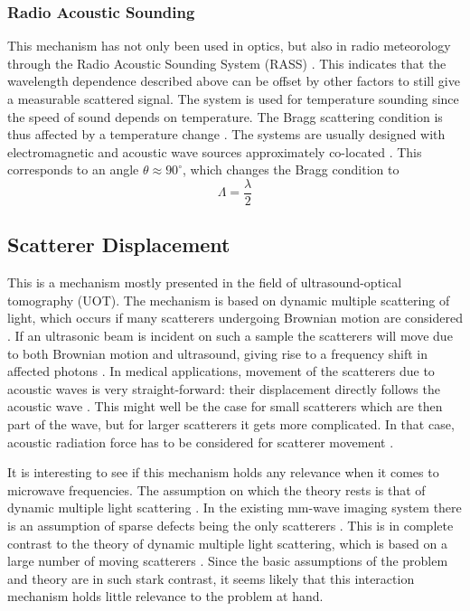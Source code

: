 \documentclass[10pt,a4paper]{eitExjobb}
\begin{document}
	\subsubsection{Radio Acoustic Sounding} 
	This mechanism has not only been used in optics, but also in radio meteorology through the Radio Acoustic Sounding System (RASS) \cite{Buerkle2007}. This indicates that the wavelength dependence described above can be offset by other factors to still give a measurable scattered signal. The system is used for temperature sounding since the speed of sound depends on temperature. The Bragg scattering condition is thus affected by a temperature change \cite{Marshall1972}. The systems are usually designed with electromagnetic and acoustic wave sources approximately co-located \cite{Marshall1972}. This corresponds to an angle $\theta \approx 90^\circ$, which changes the Bragg condition to
	\begin{equation*}
	\Lambda = \frac{\lambda}{2}
	\end{equation*}
	
	\subsection{Scatterer Displacement}
	This is a mechanism mostly presented in the field of ultrasound-optical tomography (UOT). The mechanism is based on dynamic multiple scattering of light, which occurs if many scatterers undergoing Brownian motion are considered \cite{Leutz1995}. If an ultrasonic beam is incident on such a sample the scatterers will move due to both Brownian motion and ultrasound, giving rise to a frequency shift in affected photons \cite{Leutz1995}\cite{Elson2011}. In medical applications, movement of the scatterers due to acoustic waves is very straight-forward: their displacement directly follows the acoustic wave \cite{Leutz1995}. This might well be the case for small scatterers which are then part of the wave, but for larger scatterers it gets more complicated. In that case, acoustic radiation force has to be considered for scatterer movement \cite{Torr1984}. 
	
	It is interesting to see if this mechanism holds any relevance when it comes to microwave frequencies. The assumption on which the theory rests is that of dynamic multiple light scattering \cite{Leutz1995}. In the existing mm-wave imaging system there is an assumption of sparse defects being the only scatterers \cite{Helander2017}. This is in complete contrast to the theory of dynamic multiple light scattering, which is based on a large number of moving scatterers \cite{Leutz1995}. Since the basic assumptions of the problem and theory are in such stark contrast, it seems likely that this interaction mechanism holds little relevance to the problem at hand.
	
\end{document}
